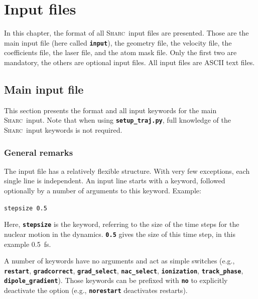 \documentclass[a4paper,10pt,DIV=15,openany]{scrbook}
\newcommand{\sharc}{\textsc{Sharc}}
\newcommand{\ttt}[1]{\textbf{\texttt{#1}}}
\newenvironment{example}{
  \setlength{\OuterFrameSep}{3pt}
  \vspace{0mm}
  \definecolor{shadecolor}{HTML}{E4F4FF}
  \begin{shaded}
}{
  \end{shaded}
}
\begin{document}

\chapter{Input files}\label{chap:input}

In this chapter, the format of all \sharc\ input files are presented. Those are the main input file (here called \ttt{input}), the geometry file, the velocity file, the coefficients file, the laser file, and the atom mask file. Only the first two are mandatory, the others are optional input files. All input files are ASCII text files.


\section{Main input file}\label{sec:inputfile}

This section presents the format and all input keywords for the main \sharc\ input. Note that when using \ttt{setup\_traj.py}, full knowledge of the \sharc\ input keywords is not required.

\subsection{General remarks}

The input file has a relatively flexible structure. With very few exceptions, each single line is independent. An input line starts with a keyword, followed optionally by a number of arguments to this keyword. Example:

\begin{example}
  \verb|stepsize 0.5|
\end{example}

Here, \ttt{stepsize} is the keyword, referring to the size of the time steps for the nuclear motion in the dynamics. \ttt{0.5} gives the size of this time step, in this example 0.5~fs.

A number of keywords have no arguments and act as simple switches (e.g., \ttt{restart}, \ttt{gradcorrect}, \ttt{grad\_select}, \ttt{nac\_select}, \ttt{ionization}, \ttt{track\_phase}, \ttt{dipole\_gradient}). Those keywords can be prefixed with \ttt{no} to explicitly deactivate the option (e.g., \ttt{norestart} deactivates restarts).
\end{document}
